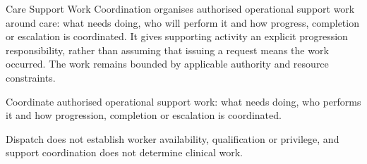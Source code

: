 Care Support Work Coordination organises authorised operational support work around care: what needs doing, who will perform it and how progress, completion or escalation is coordinated. It gives supporting activity an explicit progression responsibility, rather than assuming that issuing a request means the work occurred. The work remains bounded by applicable authority and resource constraints.



Coordinate authorised operational support work: what needs doing, who performs it and how progression, completion or escalation is coordinated.



Dispatch does not establish worker availability, qualification or privilege, and support coordination does not determine clinical work.


